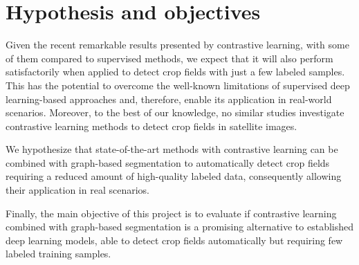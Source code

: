 \documentclass[12pt]{article}
\begin{document}


% 

\section{Hypothesis and objectives}\label{section:objetivos}

Given the recent remarkable results presented by contrastive learning, with some of them compared to supervised methods, we expect that it will also perform satisfactorily when applied to detect crop fields with just a few labeled samples. This has the potential to overcome the well-known limitations of supervised deep learning-based approaches and, therefore, enable its application in real-world scenarios. Moreover, to the best of our knowledge, no similar studies investigate contrastive learning methods to detect crop fields in satellite images.

We hypothesize that state-of-the-art methods with contrastive learning can be combined with graph-based segmentation to automatically detect crop fields requiring a reduced amount of high-quality labeled data, consequently allowing their application in real scenarios.

Finally, the main objective of this project is to evaluate if contrastive learning combined with graph-based segmentation is a promising alternative to established deep learning models, able to detect crop fields automatically but requiring few labeled training samples. %
\end{document}
